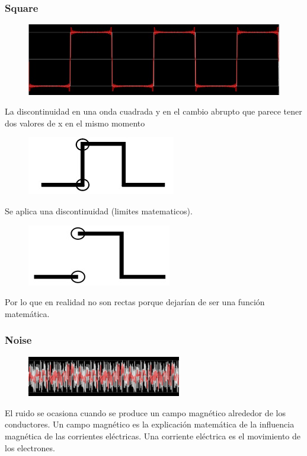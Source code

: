 \documentclass[../main.tex]{subfiles}
\begin{document}
	\subsubsection{Square}
	\begin{figure}[H]
		\includegraphics[width= 0.6 \textwidth]{imagen6.png}
		\centering
	\end{figure}
	La discontinuidad en una onda cuadrada y en el cambio abrupto que 
	parece tener dos valores de x en el mismo momento
	\begin{figure}[H]
		\includegraphics[width= 0.3 \textwidth]{imagen7.png}
	\end{figure}
	Se aplica una discontinuidad (limites matematicos).
	\begin{figure}[H]
		\includegraphics[width= 0.3 \textwidth]{imagen8.png}
	\end{figure}
	Por lo que en realidad no son rectas porque dejarían de ser una función matemática.

	\subsubsection{Noise}
	\begin{figure}[H]
		\includegraphics[width=0.6\textwidth]{imagen9.png}
		\centering
	\end{figure}
	El ruido se ocasiona cuando se produce un campo magnético alrededor de los conductores.
	Un campo magnético es la explicación matemática de la influencia magnética de
	las corrientes eléctricas. Una corriente eléctrica es el movimiento de los electrones.
\end{document}
